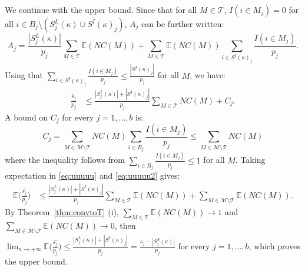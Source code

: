 \documentclass[aos]{imsart}
\theoremstyle{plain}
\newcommand{\E}{\mathbb{E}}
\newcommand{\M}{\mathcal{M}}
\newcommand{\T}{\mathcal{T}}
\begin{document}
We continue with the upper bound. Since that for all $M\in\T$, $I(i\in M_j)=0$ for all $i\in B_j\setminus(S^{L}_j(\kappa)\cup S^{I}(\kappa)_j)$, $A_j$ can be further written:
$$
  A_j
   = \frac{|S^{L}_j(\kappa)|}{p_j}\sum_{M \in \T}\E(NC(M))+\sum_{M \in \T}\E(NC(M))\sum_{i \in S^{I}(\kappa)_j}\frac{I(i\in M_j)}{p_j}.
$$
Using that $\sum_{i \in S^{I}(\kappa)_j}\frac{I(i\in M_j)}{p_j}\leq \frac{|S^{I}(\kappa)_j|}{p_j}$ for all $M$, we have:
\begin{eqnarray}\label{eq:uuuuu}
    \frac{\widehat{s}_j}{p_j}&\leq \frac{|S^{L}_j(\kappa)|+|S^{I}(\kappa)_j|}{p_j}\sum_{M \in \T}NC(M) + C_j.
\end{eqnarray}
A bound on $C_j$ for every $j=1,\ldots,b$ is:
\begin{equation}\label{eq:uuuuu2}
    C_j = \sum_{M \in \M\setminus \T}NC(M)\sum_{i \in B_j}\frac{I(i\in M_j)}{p_j}\leq \sum_{M \in \M\setminus \T}NC(M)
\end{equation}
where the inequality follows from $\sum_{i \in B_j}\frac{I(i\in M_j)}{p_j}\leq 1$ for all $M$.
Taking expectation in \eqref{eq:uuuuu} and \eqref{eq:uuuuu2} gives:
\begin{eqnarray*}
    \E\bigg(\frac{\widehat{s_j}}{p_j}\bigg) 
    &\leq \frac{|S^{L}_j(\kappa)|+|S^{I}(\kappa)_j|}{p_j}\sum_{M \in \T}\E(NC(M)) + \sum_{M \in \M\setminus \T}\E(NC(M)).
\end{eqnarray*}
 By Theorem~\ref{thm:convtoT} (i), $\sum_{M \in \T}\E(NC(M))\to 1$ and $\sum_{M \in \M\setminus\T}\E(NC(M))\to 0$, then $ \lim_{n\to+\infty}\E\big(\frac{\widehat{s_j}}{p_j}\big) \leq  \frac{|S^{L}_j(\kappa)|+|S^{I}(\kappa)_j|}{p_j}= \frac{s_j-|S^{S}_j(\kappa)|}{p_j}$ for every $j=1,\ldots,b$, which proves the upper bound.
\end{document}
